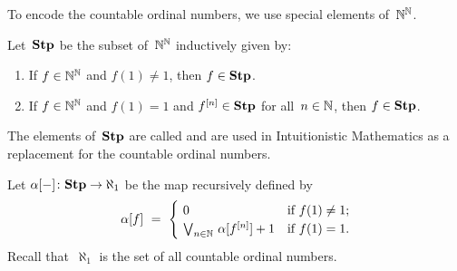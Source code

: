 To encode the countable ordinal numbers,
we use special elements of~$\mathbb{N}^{\mathbb{N}}$.
\begin{dfn}
\label{D:bhier-stump}
Let~$\mathbf{Stp}$ be the subset  of~$\mathbb{N}^{\mathbb{N}}$
inductively given by:
\begin{enumerate}
\item
If $f\in\mathbb{N}^{\mathbb{N}}$ and $f(1)\neq 1$, then $f\in \mathbf{Stp}$.

\item
If $f\in\mathbb{N}^{\mathbb{N}}$
and $f(1)=1$
and $f^{[n]}\in\mathbf{Stp}$ for all~$n\in\mathbb{N}$,
then $f\in \mathbf{Stp}$.
\end{enumerate}
The elements of~$\mathbf{Stp}$
are called 
and are used in Intuitionistic Mathematics
as a replacement for the countable ordinal numbers.
\end{dfn}
\begin{dfn}
\label{D:bhier-alpha}
Let $\alpha[-]\colon \mathbf{Stp} \rightarrow \aleph_1$
be the map recursively defined by
\begin{equation*}
\alpha[f]\ =\ 
\begin{cases}
\ 0&
\text{if $f(1)\neq1$;}\\
\ \bv_{n\in \N}\ \alpha[f^{[n]}]+1&
\text{if $f(1)= 1$.}
\end{cases}
\end{equation*}
Recall that~$\aleph_1$
is the set of all countable ordinal numbers.
\end{dfn}

